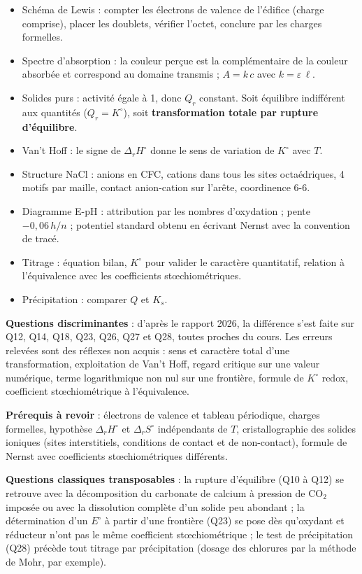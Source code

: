 \documentclass[11pt,a4paper]{article}
\providecommand{\tightlist}{\setlength{\itemsep}{0pt}\setlength{\parskip}{0pt}}
\begin{document}
\begin{itemize}
\tightlist
\item
  Schéma de Lewis : compter les électrons de valence de l'édifice (charge comprise), placer les doublets, vérifier l'octet, conclure par les charges formelles.
\item
  Spectre d'absorption : la couleur perçue est la complémentaire de la couleur absorbée et correspond au domaine transmis ; \(A = k\,c\) avec \(k = \varepsilon\,\ell\).
\item
  Solides purs : activité égale à 1, donc \(Q_r\) constant. Soit équilibre indifférent aux quantités (\(Q_r = K^\circ\)), soit \textbf{transformation totale par rupture d'équilibre}.
\item
  Van't Hoff : le signe de \(\Delta_r H^\circ\) donne le sens de variation de \(K^\circ\) avec \(T\).
\item
  Structure NaCl : anions en CFC, cations dans tous les sites octaédriques, 4 motifs par maille, contact anion-cation sur l'arête, coordinence 6-6.
\item
  Diagramme E-pH : attribution par les nombres d'oxydation ; pente \(-0{,}06\,h/n\) ; potentiel standard obtenu en écrivant Nernst avec la convention de tracé.
\item
  Titrage : équation bilan, \(K^\circ\) pour valider le caractère quantitatif, relation à l'équivalence avec les coefficients stœchiométriques.
\item
  Précipitation : comparer \(Q\) et \(K_s\).
\end{itemize}

\textbf{Questions discriminantes} : d'après le rapport 2026, la différence s'est faite sur Q12, Q14, Q18, Q23, Q26, Q27 et Q28, toutes proches du cours. Les erreurs relevées sont des réflexes non acquis : sens et caractère total d'une transformation, exploitation de Van't Hoff, regard critique sur une valeur numérique, terme logarithmique non nul sur une frontière, formule de \(K^\circ\) redox, coefficient stœchiométrique à l'équivalence.

\textbf{Prérequis à revoir} : électrons de valence et tableau périodique, charges formelles, hypothèse \(\Delta_r H^\circ\) et \(\Delta_r S^\circ\) indépendants de \(T\), cristallographie des solides ioniques (sites interstitiels, conditions de contact et de non-contact), formule de Nernst avec coefficients stœchiométriques différents.

\textbf{Questions classiques transposables} : la rupture d'équilibre (Q10 à Q12) se retrouve avec la décomposition du carbonate de calcium à pression de \(\mathrm{CO_2}\) imposée ou avec la dissolution complète d'un solide peu abondant ; la détermination d'un \(E^\circ\) à partir d'une frontière (Q23) se pose dès qu'oxydant et réducteur n'ont pas le même coefficient stœchiométrique ; le test de précipitation (Q28) précède tout titrage par précipitation (dosage des chlorures par la méthode de Mohr, par exemple).
\end{document}
